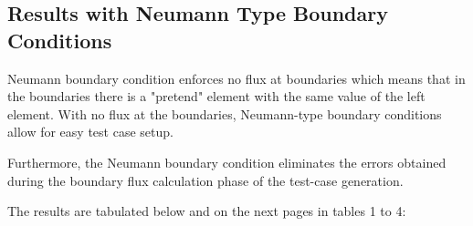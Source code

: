 \documentclass[a4paper, 12pt]{article}
\begin{document}
\subsection{Results with Neumann Type Boundary Conditions}
Neumann boundary condition enforces no flux at boundaries which means that in the boundaries there is a "pretend" element with the same value of the left element. With no flux at the boundaries, Neumann-type boundary conditions allow for easy test case setup.\\\par 
Furthermore, the Neumann boundary condition eliminates the errors obtained during the boundary flux calculation phase of the test-case generation.\\\par
The results are tabulated below and on the next pages in tables 1 to 4: \\\par
\label{T1}
\end{document}

